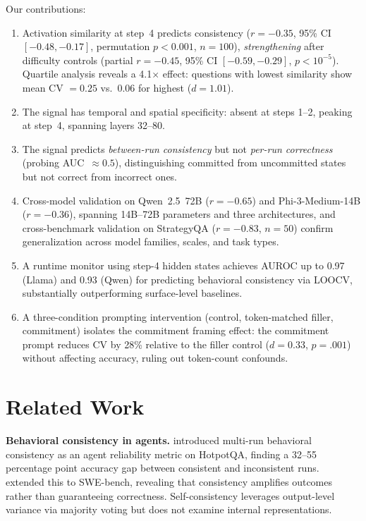 \documentclass{article}
\begin{document}
Our contributions:
\begin{enumerate}
    \item Activation similarity at step~4 predicts consistency ($r = -0.35$, 95\% CI $[-0.48, -0.17]$, permutation $p < 0.001$, $n{=}100$), \emph{strengthening} after difficulty controls (partial $r = -0.45$, 95\% CI $[-0.59, -0.29]$, $p < 10^{-5}$). Quartile analysis reveals a 4.1$\times$ effect: questions with lowest similarity show mean CV $= 0.25$ vs.\ $0.06$ for highest ($d = 1.01$).
    \item The signal has temporal and spatial specificity: absent at steps 1--2, peaking at step~4, spanning layers 32--80.
    \item The signal predicts \emph{between-run consistency} but not \emph{per-run correctness} (probing AUC~$\approx 0.5$), distinguishing committed from uncommitted states but not correct from incorrect ones.
    \item Cross-model validation on Qwen~2.5~72B ($r = -0.65$) and Phi-3-Medium-14B ($r = -0.36$), spanning 14B--72B parameters and three architectures, and cross-benchmark validation on StrategyQA ($r = -0.83$, $n{=}50$) confirm generalization across model families, scales, and task types.
    \item A runtime monitor using step-4 hidden states achieves AUROC up to 0.97 (Llama) and 0.93 (Qwen) for predicting behavioral consistency via LOOCV, substantially outperforming surface-level baselines.
    \item A three-condition prompting intervention (control, token-matched filler, commitment) isolates the commitment framing effect: the commitment prompt reduces CV by 28\% relative to the filler control ($d = 0.33$, $p = .001$) without affecting accuracy, ruling out token-count confounds.
\end{enumerate}

\section{Related Work}

\textbf{Behavioral consistency in agents.} \citet{anonymous2026a} introduced multi-run behavioral consistency as an agent reliability metric on HotpotQA, finding a 32--55 percentage point accuracy gap between consistent and inconsistent runs. \citet{anonymous2026b} extended this to SWE-bench, revealing that consistency amplifies outcomes rather than guaranteeing correctness. Self-consistency \citep{wang2023selfconsistency} leverages output-level variance via majority voting but does not examine internal representations.
\end{document}
